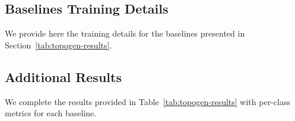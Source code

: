 \subsection{Baselines Training Details}
\label{ssec:topogen-baseline-training}

We provide here the training details for the baselines presented in Section~\ref{tab:topogen-results}.


\subsection{Additional Results}
\label{ssec:topogen-additional-results}

We complete the results provided in Table~\ref{tab:topogen-results} with per-class metrics for each baseline. 
